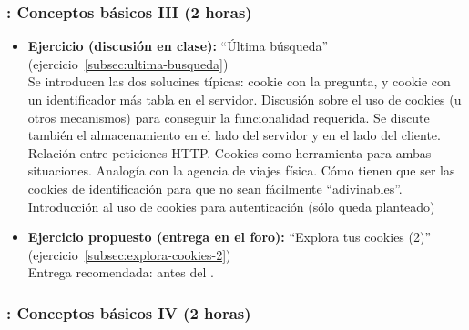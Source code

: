 \documentclass[a4paper,12pt]{article}
\begin{document}
\subsubsection{\juevesD: Conceptos básicos III (2 horas)}
\label{cal:juevesD}

\begin{itemize}
\item \textbf{Ejercicio (discusión en clase):} ``Última búsqueda'' (ejercicio~\ref{subsec:ultima-busqueda}) \\
  Se introducen las dos solucines típicas: cookie con la pregunta, y cookie con un identificador más tabla en el servidor.
  Discusión sobre el uso de cookies (u otros mecanismos) para conseguir la funcionalidad requerida. Se discute también el almacenamiento en el lado del servidor y en el lado del cliente. Relación entre peticiones HTTP. Cookies como herramienta para ambas situaciones. Analogía con la agencia de viajes física. Cómo tienen que ser las cookies de identificación para que no sean fácilmente ``adivinables''. Introducción al uso de cookies para autenticación (sólo queda planteado)
\item \textbf{Ejercicio propuesto (entrega en el foro):} ``Explora tus cookies (2)'' (ejercicio~\ref{subsec:explora-cookies-2}) \\
  Entrega recomendada: antes del \juevesE.
\end{itemize}


\subsubsection{\juevesE: Conceptos básicos IV (2 horas)}
\label{cal:juevesE}
\end{document}
